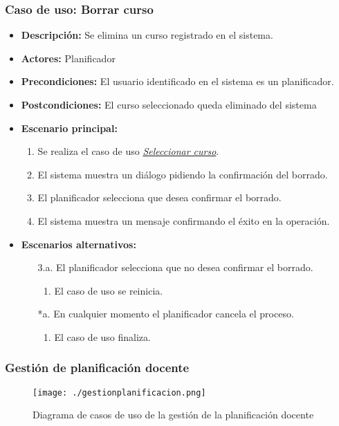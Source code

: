 \subsubsection*{Caso de uso: Borrar curso}
\begin{itemize}
\item{\bf Descripción:} Se elimina un curso registrado en el sistema.
\item{\bf Actores:} Planificador
\item{\bf Precondiciones:} El usuario identificado en el sistema es un planificador.
\item{\bf Postcondiciones:} El curso seleccionado queda eliminado del sistema
\item{\bf Escenario principal:}
	\begin{enumerate}
	\item Se realiza el caso de uso {\em \hyperref[select_curso]{Seleccionar curso}}.
	\item El sistema muestra un diálogo pidiendo la confirmación del borrado.
	\item El planificador selecciona que desea confirmar el borrado.
	\item El sistema muestra un mensaje confirmando el éxito en la operación.
	\end{enumerate}
\item{\bf Escenarios alternativos:}
	\begin{itemize}
		\item[3.a.] El planificador selecciona que no desea confirmar el borrado.
		\begin{enumerate}
			\item El caso de uso se reinicia.
		\end{enumerate}
		\item[*a.] En cualquier momento el planificador cancela el proceso.
		\begin{enumerate}
			\item El caso de uso finaliza.
		\end{enumerate}
	\end{itemize}
\end{itemize}


\subsubsection{Gestión de planificación docente}
\begin{figure}[H] 
  \label{gestion-planificacion} 
	\begin{center}
    \texttt{[image: ./gestionplanificacion.png]}
  \end{center}
\caption{Diagrama de casos de uso de la gestión de la planificación docente}
\end{figure}
